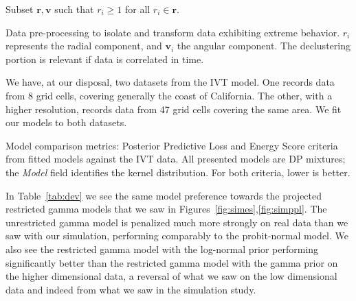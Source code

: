 \begin{algorithm}
  \label{algo:processing}
  Subset $\bm{ r},\bm{ v}$ such that $r_i \geq 1$ for all $r_i\in \bm{r}$.\\
 \caption{Data pre-processing to isolate and transform data exhibiting extreme behavior.  $r_i$ represents the radial component, 
    and $\bm{v}_i$ the angular component.  The declustering portion is relevant if data is correlated in time.}
\end{algorithm}

We have, at our disposal, two datasets from the IVT model.  One records data from 8 grid cells, covering
  generally the coast of California.  The other, with a higher resolution, records data from 47 grid
  cells covering the same area.  We fit our models to both datasets.

\begin{table}[hb]
  \label{tab:dev}
  \centering
  
  \caption{Model comparison metrics: Posterior Predictive Loss and Energy Score criteria from fitted
    models against the IVT data.  All presented models are DP mixtures; the \emph{Model} field
    identifies the kernel distribution.  For both criteria, lower is better.}
\end{table}

In Table~\ref{tab:dev} we see the same model preference towards the projected restricted gamma models
  that we saw in Figures~\ref{fig:simes},\ref{fig:simppl}.  The unrestricted gamma model is penalized much
  more strongly on real data than we saw with our simulation, performing comparably to the probit-normal
  model.  We also see the restricted gamma model with the log-normal prior performing significantly
  better than the restricted gamma model with the gamma prior on the higher dimensional data, a reversal
  of what we saw on the low dimensional data and indeed from what we saw in the simulation study.

